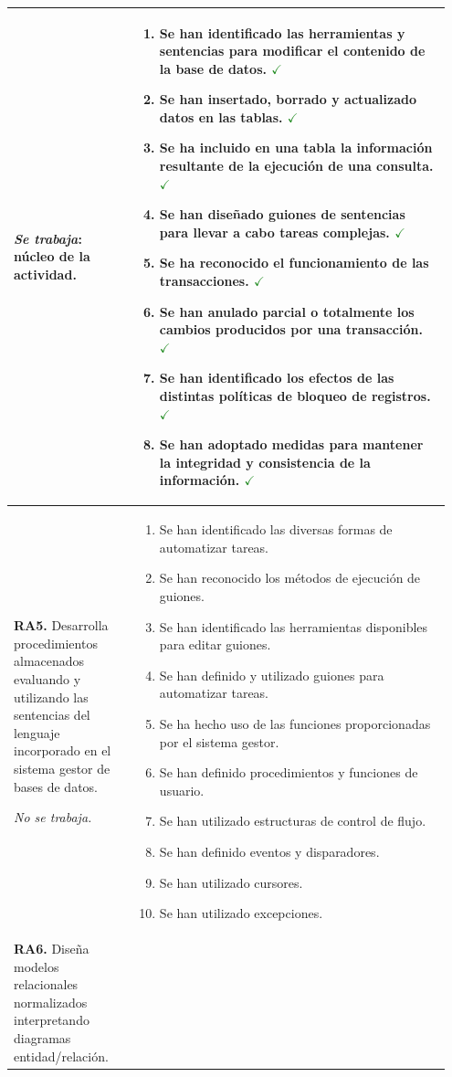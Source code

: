 \documentclass[11pt,a4paper]{article}
\newcommand{\trab}{\textcolor{ForestGreen}{\ensuremath{\checkmark}}}
\begin{document}
\begin{longtable}{@{}p{0.27\linewidth}p{0.68\linewidth}@{}}
\smallskip\emph{Se trabaja}: núcleo de la actividad.
&
\begin{enumerate}[label=\alph*), leftmargin=*, nosep]
  \item Se han identificado las herramientas y sentencias para modificar el contenido
        de la base de datos. \trab
  \item Se han insertado, borrado y actualizado datos en las tablas. \trab
  \item Se ha incluido en una tabla la información resultante de la ejecución de una
        consulta. \trab
  \item Se han diseñado guiones de sentencias para llevar a cabo tareas complejas. \trab
  \item Se ha reconocido el funcionamiento de las transacciones. \trab
  \item Se han anulado parcial o totalmente los cambios producidos por una transacción.
        \trab
  \item Se han identificado los efectos de las distintas políticas de bloqueo de
        registros. \trab
  \item Se han adoptado medidas para mantener la integridad y consistencia de la
        información. \trab
\end{enumerate} \\
\midrule
\textbf{RA5.} Desarrolla procedimientos almacenados evaluando y utilizando las sentencias
del lenguaje incorporado en el sistema gestor de bases de datos.

\smallskip\emph{No se trabaja.}
&
\begin{enumerate}[label=\alph*), leftmargin=*, nosep]
  \item Se han identificado las diversas formas de automatizar tareas.
  \item Se han reconocido los métodos de ejecución de guiones.
  \item Se han identificado las herramientas disponibles para editar guiones.
  \item Se han definido y utilizado guiones para automatizar tareas.
  \item Se ha hecho uso de las funciones proporcionadas por el sistema gestor.
  \item Se han definido procedimientos y funciones de usuario.
  \item Se han utilizado estructuras de control de flujo.
  \item Se han definido eventos y disparadores.
  \item Se han utilizado cursores.
  \item Se han utilizado excepciones.
\end{enumerate} \\
\midrule
\textbf{RA6.} Diseña modelos relacionales normalizados interpretando diagramas
entidad/relación.


\end{longtable}
\end{document}
